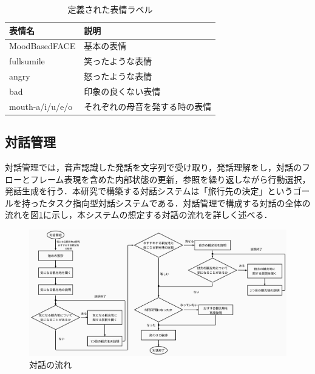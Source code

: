 \begin{table}[hbtp]
    \caption{定義された表情ラベル}
    \label{labels}
    \centering
    \begin{tabular}{l|l}
    \hline
    表情名           & 説明              \\ \hline
    MoodBasedFACE   & 基本の表情           \\
    fullsumile      & 笑ったような表情        \\
    angry           & 怒ったような表情        \\
    bad             & 印象の良くない表情       \\
    mouth-a/i/u/e/o & それぞれの母音を発する時の表情 \\ \hline
    \end{tabular}
\end{table}

\subsection{対話管理}
\label{対話管理}
対話管理では，音声認識した発話を文字列で受け取り，発話理解をし，対話のフローとフレーム表現を含めた内部状態の更新，参照を繰り返しながら行動選択，発話生成を行う．本研究で構築する対話システムは「旅行先の決定」というゴールを持ったタスク指向型対話システムである．対話管理で構成する対話の全体の流れを図\ref{flow}に示し，本システムの想定する対話の流れを詳しく述べる．

\begin{figure}[th]
    \centering
    \includegraphics[scale=0.18]{pic/flow.pdf}
    \caption{対話の流れ}
    \label{flow}
\end{figure}

